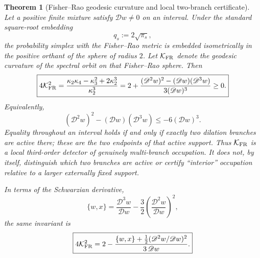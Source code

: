 \documentclass[aps,prd,preprint,onecolumn,nofootinbib,superscriptaddress,showkeys]{revtex4-2}
\numberwithin{equation}{section}
\theoremstyle{definition}
\theoremstyle{plain}
\newtheorem{theorem}{Theorem}[section]
\newcommand{\Dil}{\mathscr D}
\begin{document}
\begin{theorem}[Fisher--Rao geodesic curvature and local two-branch certificate]\label{thm:geodesic-curvature}
Let a positive finite mixture satisfy \(\Dil w\ne0\) on an interval.  Under the standard square-root embedding
\[
q_s:=2\sqrt{\pi_s},
\]
the probability simplex with the Fisher--Rao metric is embedded isometrically in the positive orthant of the sphere of radius \(2\).  Let \(\mathcal K_{\rm FR}\) denote the geodesic curvature of the spectral orbit on that Fisher--Rao sphere.  Then
\begin{equation}
\boxed{
4\mathcal K_{\rm FR}^2
=
\frac{\kappa_2\kappa_4-\kappa_3^2+2\kappa_2^3}{\kappa_2^3}
=
2+\frac{(\Dil^2w)^2-(\Dil w)(\Dil^3w)}{3(\Dil w)^3}
\ge0.
}
\label{eq:fisher-geodesic-curvature}
\end{equation}
Equivalently,
\begin{equation}
\boxed{
(\Dil^2w)^2-(\Dil w)(\Dil^3w)
\le -6(\Dil w)^3.
}
\label{eq:fisher-geodesic-inequality}
\end{equation}
Equality throughout an interval holds if and only if exactly two dilation branches are active there; these are the two endpoints of that active support.  Thus \(\mathcal K_{\rm FR}\) is a local third-order detector of genuinely multi-branch occupation.  It does not, by itself, distinguish which two branches are active or certify ``interior'' occupation relative to a larger externally fixed support.

In terms of the Schwarzian derivative,
\begin{equation}
\{w,x\}
=
\frac{\Dil^3w}{\Dil w}
-\frac32\left(\frac{\Dil^2w}{\Dil w}\right)^2,
\end{equation}
the same invariant is
\begin{equation}
\boxed{
4\mathcal K_{\rm FR}^2
=
2-\frac{\{w,x\}+\tfrac12(\Dil^2w/\Dil w)^2}{3\,\Dil w}.
}
\end{equation}
\end{theorem}
\end{document}
